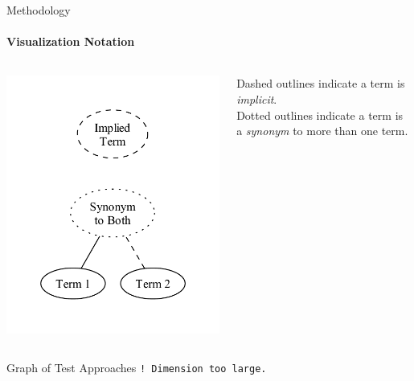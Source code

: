 \documentclass{beamer}
\begin{document}
\begin{frame}[t]{Methodology}
    \framesubtitle{Visualization Notation}
    \begin{columns}[T]
        \begin{column}{.5\textwidth}
            \vspace{-0.5cm}
            \centering
            \includegraphics[width=\linewidth]{assets/graphs/manual/catRels8.pdf}
        \end{column}
        \begin{column}{.5\textwidth}
            \vspace{0.75cm}
            Dashed outlines indicate a term is \emph{implicit}.\\
            \vspace{1.3cm}
            Dotted outlines indicate a term is a \emph{synonym} to more than one term.
        \end{column}
    \end{columns}
\end{frame}

\begin{frame}{Graph of Test Approaches}
    \pause \large \centering \texttt{! Dimension too large.}
\end{frame}
\end{document}
